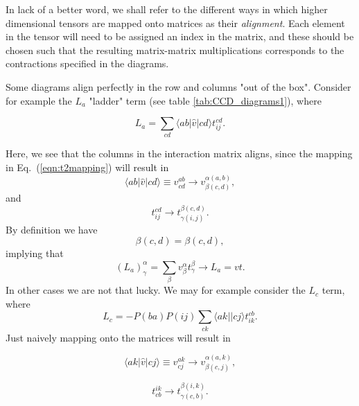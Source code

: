 In lack of a better word, we shall refer to the different ways in
which higher dimensional tensors are mapped onto matrices as their
\emph{alignment}. Each element in the tensor will need to be assigned
an index in the matrix, and these should be chosen such that the
resulting matrix-matrix multiplications corresponds to the
contractions specified in the diagrams.

Some diagrams align perfectly in the row and columns "out of the box". Consider for example the $L_a$ "ladder" term \cite{ShavittBartlett2009} (see table \ref{tab:CCD_diagrams1}), where

\begin{equation}
L_a = \sum_{cd} \langle a b \vert \hat{v}\vert c d \rangle t^{cd}_{ij}.
\label{eqn:L1diag}
\end{equation}

Here, we see that the columns in the interaction matrix aligns, since the mapping in 
Eq.~(\ref{eqn:t2mapping}) will result in 
\begin{equation}
 \langle a b \vert \hat{v}\vert c d \rangle \equiv v^{ab}_{cd}  \rightarrow v^{\alpha(a,b)}_{\beta(c,d)},
\end{equation}
and
\begin{equation}
t^{cd}_{ij}  \rightarrow t^{\beta(c,d)}_{\gamma(i,j)}.
\end{equation}
By definition we have
\begin{equation}
\beta(c,d) = \beta(c,d),
\end{equation}
implying that
\begin{equation}
(L_a)^{\alpha}_{\gamma} = \sum_{\beta} v^\alpha_\beta t^\beta_\gamma \rightarrow L_a = v t.
\label{eqn:L1diag_mapped}
\end{equation}
In other cases we are not that lucky. We may for example consider the $L_c$ term, where
\begin{equation}
L_c  = -P(ba)P(ij)  \sum_{ck} \langle ak \vert \vert cj \rangle t_{ik}^{cb}.
\end{equation}
Just naively mapping onto the matrices will result in

\begin{equation}
 \langle ak \vert \hat{v}\vert cj \rangle \equiv v^{ak}_{cj}  \rightarrow v^{\alpha(a,k)}_{\beta(c,j)},
\end{equation}

\begin{equation}
t^{ik}_{cb}  \rightarrow t^{\beta(i,k)}_{\gamma(c,b)}.
\end{equation}

